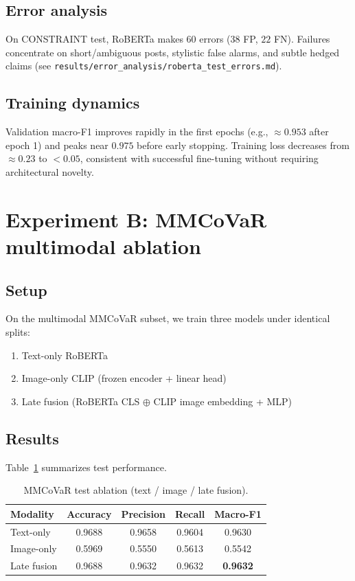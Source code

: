 \subsection{Error analysis}
On CONSTRAINT test, RoBERTa makes $60$ errors ($38$ FP, $22$ FN).
Failures concentrate on short/ambiguous posts, stylistic false alarms, and subtle hedged claims
(see \texttt{results/error\_analysis/roberta\_test\_errors.md}).

\subsection{Training dynamics}
Validation macro-F1 improves rapidly in the first epochs (e.g., $\approx 0.953$ after epoch 1) and peaks near $0.975$ before early stopping.
Training loss decreases from $\approx 0.23$ to $<0.05$, consistent with successful fine-tuning without requiring architectural novelty.

\section{Experiment B: MMCoVaR multimodal ablation}
\label{sec:exp-mmcovar}

\subsection{Setup}
On the multimodal MMCoVaR subset, we train three models under identical splits:
\begin{enumerate}
  \item Text-only RoBERTa
  \item Image-only CLIP (frozen encoder + linear head)
  \item Late fusion (RoBERTa CLS $\oplus$ CLIP image embedding + MLP)
\end{enumerate}

\subsection{Results}
Table~\ref{tab:ablation} summarizes test performance.

\begin{table}[H]
\centering
\caption{MMCoVaR test ablation (text / image / late fusion).}
\label{tab:ablation}
\begin{tabular}{lcccc}
\toprule
Modality & Accuracy & Precision & Recall & Macro-F1 \\
\midrule
Text-only   & 0.9688 & 0.9658 & 0.9604 & 0.9630 \\
Image-only  & 0.5969 & 0.5550 & 0.5613 & 0.5542 \\
Late fusion & 0.9688 & 0.9632 & 0.9632 & \textbf{0.9632} \\
\bottomrule
\end{tabular}
\end{table}

